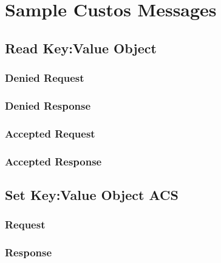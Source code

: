 \chapter{Sample Custos Messages}
\label{appx:messages}

\section{Read Key:Value Object}

\subsection{Denied Request}

\subsection{Denied Response}

\subsection{Accepted Request}

\subsection{Accepted Response}

\section{Set Key:Value Object ACS}

\subsection{Request}

\subsection{Response}
